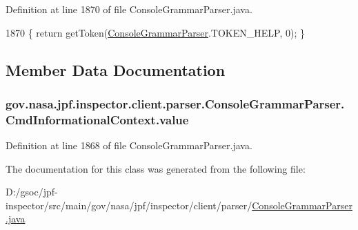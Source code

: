 Definition at line 1870 of file Console\+Grammar\+Parser.\+java.


\begin{DoxyCode}
1870 \{ \textcolor{keywordflow}{return} getToken(\hyperlink{classgov_1_1nasa_1_1jpf_1_1inspector_1_1client_1_1parser_1_1_console_grammar_parser_a03e28f396e991cff9d014f357ae220f3}{ConsoleGrammarParser}.TOKEN\_HELP, 0); \}
\end{DoxyCode}


\subsection{Member Data Documentation}
\subsubsection[{\texorpdfstring{value}{value}}]{ gov.\+nasa.\+jpf.\+inspector.\+client.\+parser.\+Console\+Grammar\+Parser.\+Cmd\+Informational\+Context.\+value}\hypertarget{classgov_1_1nasa_1_1jpf_1_1inspector_1_1client_1_1parser_1_1_console_grammar_parser_1_1_cmd_informational_context_a1cb752c3fe7b59f878a38bf22f47f794}{}\label{classgov_1_1nasa_1_1jpf_1_1inspector_1_1client_1_1parser_1_1_console_grammar_parser_1_1_cmd_informational_context_a1cb752c3fe7b59f878a38bf22f47f794}


Definition at line 1868 of file Console\+Grammar\+Parser.\+java.



The documentation for this class was generated from the following file\+:\begin{DoxyCompactItemize}
\item 
D\+:/gsoc/jpf-\/inspector/src/main/gov/nasa/jpf/inspector/client/parser/\hyperlink{_console_grammar_parser_8java}{Console\+Grammar\+Parser.\+java}\end{DoxyCompactItemize}
